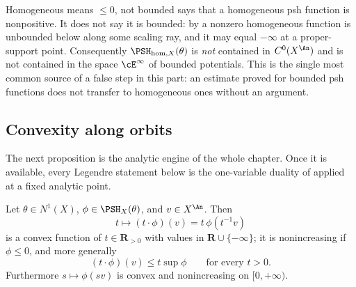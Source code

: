 \begin{warning}{Homogeneous means $\leq0$, not bounded}
 says that a homogeneous psh
function is nonpositive.  It does not say it is bounded: by
 a nonzero homogeneous function is
unbounded below along some scaling ray, and it may equal $-\infty$ at a
proper-support point.  Consequently $\PSH_{\mathrm{hom},X}(\theta)$ is
\emph{not} contained in $C^0(X^{\An})$ and is not contained in the space
$\cE^\infty$ of bounded potentials.  This is the single most common source
of a false step in this part: an estimate proved for bounded psh functions
does not transfer to homogeneous ones without an argument.
\end{warning}

\subsection{Convexity along orbits}
\label{sec:ch35-convexity}

The next proposition is the analytic engine of the whole chapter.  Once it
is available, every Legendre statement below is the one-variable duality of
 applied at a fixed analytic point.

\begin{proposition}
\label{prop:ch35-scaling-convex}
Let $\theta\in N^1(X)$, $\phi\in\PSH_X(\theta)$, and $v\in X^{\An}$.
Then
\begin{equation}
\label{eq:ch35-orbit-convex}
 t\longmapsto(t\cdot\phi)(v)=t\,\phi(t^{-1}v)
\end{equation}
is a convex function of $t\in\mathbf R_{>0}$ with values in
$\mathbf R\cup\{-\infty\}$; it is nonincreasing if $\phi\leq0$, and
more generally
\begin{equation}
\label{eq:ch35-orbit-slope-bound}
 (t\cdot\phi)(v)\leq t\sup\phi
 \qquad\text{for every }t>0 .
\end{equation}
Furthermore $s\mapsto\phi(sv)$ is convex and nonincreasing on
$[0,+\infty)$.
\end{proposition}

